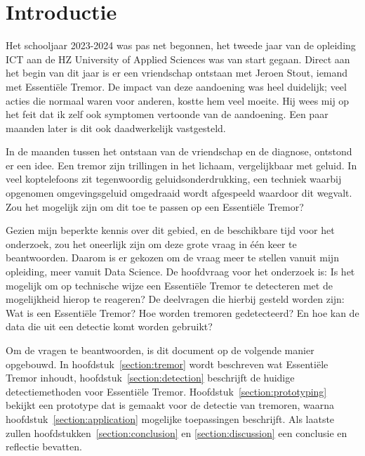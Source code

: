 \section{Introductie}

Het schooljaar 2023-2024 was pas net begonnen,
het tweede jaar van de opleiding ICT aan de HZ University of Applied Sciences was van start gegaan.
Direct aan het begin van dit jaar is er een vriendschap ontstaan met Jeroen Stout, iemand met Essentiële Tremor.
De impact van deze aandoening was heel duidelijk; veel acties die normaal waren voor anderen, kostte hem veel moeite.
Hij wees mij op het feit dat ik zelf ook symptomen vertoonde van de aandoening.
Een paar maanden later is dit ook daadwerkelijk vastgesteld.

In de maanden tussen het ontstaan van de vriendschap en de diagnose, ontstond er een idee.
Een tremor zijn trillingen in het lichaam, vergelijkbaar met geluid.
In veel koptelefoons zit tegenwoordig geluidsonderdrukking,
een techniek waarbij opgenomen omgevingsgeluid omgedraaid wordt afgespeeld waardoor dit wegvalt\cite{bose2023}.
Zou het mogelijk zijn om dit toe te passen op een Essentiële Tremor?

Gezien mijn beperkte kennis over dit gebied, en de beschikbare tijd voor het onderzoek,
zou het oneerlijk zijn om deze grote vraag in één keer te beantwoorden.
Daarom is er gekozen om de vraag meer te stellen vanuit mijn opleiding, meer vanuit Data Science.
De hoofdvraag voor het onderzoek is:
Is het mogelijk om op technische wijze een Essentiële Tremor te detecteren met de mogelijkheid hierop te reageren?
De deelvragen die hierbij gesteld worden zijn: Wat is een Essentiële Tremor? Hoe worden tremoren gedetecteerd?
En hoe kan de data die uit een detectie komt worden gebruikt?

Om de vragen te beantwoorden, is dit document op de volgende manier opgebouwd. 
In hoofdstuk~\ref{section:tremor} wordt beschreven wat Essentiële Tremor inhoudt,
hoofdstuk~\ref{section:detection} beschrijft de huidige detectiemethoden voor Essentiële Tremor.
Hoofdstuk~\ref{section:prototyping} bekijkt een prototype dat is gemaakt voor de detectie van tremoren,
waarna hoofdstuk~\ref{section:application} mogelijke toepassingen beschrijft.
Als laatste zullen hoofdstukken~\ref{section:conclusion} en \ref{section:discussion} een conclusie en reflectie bevatten.
